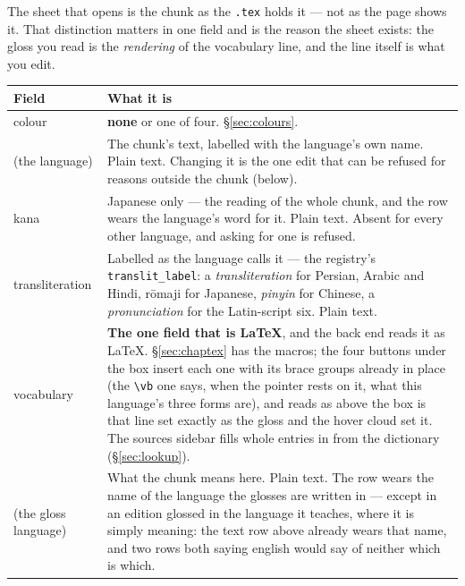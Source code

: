 \documentclass[11pt,oneside]{report}
\newcommand{\file}[1]{\texttt{#1}}
\newcommand{\menu}[1]{\textsf{#1}}
\begin{document}
The sheet that opens is the chunk as the \file{.tex} holds it --- not as the
page shows it. That distinction matters in one field and is the reason the
sheet exists: the gloss you read is the \emph{rendering} of the vocabulary
line, and the line itself is what you edit.

\begin{center}
\begin{tabular}{@{}p{}p{}@{}}
\toprule
\textsf{Field} & \textsf{What it is} \\
\midrule
\textsf{colour} & \textbf{none} or one of four. \S\ref{sec:colours}. \\
\addlinespace
\textsf{(the language)} & The chunk's text, labelled with the language's own
  name. Plain text. Changing it is the one edit that can be refused for
  reasons outside the chunk (below). \\
\addlinespace
\textsf{kana} & Japanese only --- the reading of the whole chunk, and the row
  wears the language's word for it. Plain text. Absent for every other
  language, and asking for one is refused. \\
\addlinespace
\textsf{transliteration} & Labelled as the language calls it --- the
  registry's \texttt{translit\_label}: a \emph{transliteration} for Persian,
  Arabic and Hindi, \textsf{r\=omaji} for Japanese, \emph{pinyin} for
  Chinese, a \emph{pronunciation} for the Latin-script six. Plain text. \\
\addlinespace
\textsf{vocabulary} & \textbf{The one field that is LaTeX}, and the back end
  reads it as LaTeX. \S\ref{sec:chaptex} has the macros; the four buttons
  under the box insert each one with its brace groups already in place (the
  \verb|\vb| one says, when the pointer rests on it, what this language's
  three forms are), and
  \menu{reads as} above the box is that line set exactly as the gloss and the
  hover cloud set it. The \menu{sources} sidebar fills whole entries in from
  the dictionary (\S\ref{sec:lookup}). \\
\addlinespace
\textsf{(the gloss language)} & What the chunk means here. Plain text. The
  row wears the name of the language the glosses are written in --- except in
  an edition glossed in the language it teaches, where it is simply
  \textsf{meaning}: the text row above already wears that name, and two rows
  both saying \textsf{english} would say of neither which is which. \\
\bottomrule
\end{tabular}
\end{center}
\end{document}
